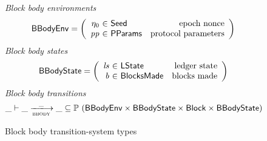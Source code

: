 \begin{figure}[ht]
  \emph{Block body environments}
  \begin{equation*}
    \BBodyEnv =
    \left(
      \begin{array}{r@{~\in~}lr}
        \eta_0 & \Seed & \text{epoch nonce}\\
        \var{pp} & \PParams & \text{protocol parameters}\\
      \end{array}
    \right)
  \end{equation*}
  \emph{Block body states}
  \begin{equation*}
    \BBodyState =
    \left(
      \begin{array}{r@{~\in~}lr}
        \var{ls} & \LState & \text{ledger state}\\
        \var{b} & \BlocksMade & \text{blocks made}\\
      \end{array}
    \right)
  \end{equation*}
  \emph{Block body transitions}
  \begin{equation*}
    \_ \vdash \var{\_} \trans{bbody}{\_} \var{\_} \subseteq
    \powerset (\BBodyEnv \times \BBodyState \times \Block \times \BBodyState)
  \end{equation*}
  \caption{Block body transition-system types}
  \label{fig:ts-types:block}
\end{figure}

